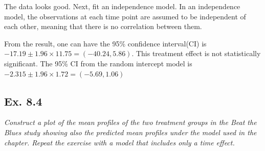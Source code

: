 \documentclass[
]{article}
\newenvironment{Shaded}{\begin{snugshade}}{\end{snugshade}}
\newcommand{\AttributeTok}[1]{\textcolor[rgb]{0.77,0.63,0.00}{#1}}
\newcommand{\ErrorTok}[1]{\textcolor[rgb]{0.64,0.00,0.00}{\textbf{#1}}}
\newcommand{\FloatTok}[1]{\textcolor[rgb]{0.00,0.00,0.81}{#1}}
\newcommand{\FunctionTok}[1]{\textcolor[rgb]{0.00,0.00,0.00}{#1}}
\newcommand{\NormalTok}[1]{#1}
\newcommand{\OtherTok}[1]{\textcolor[rgb]{0.56,0.35,0.01}{#1}}
\newcommand{\SpecialCharTok}[1]{\textcolor[rgb]{0.00,0.00,0.00}{#1}}
\newcommand{\StringTok}[1]{\textcolor[rgb]{0.31,0.60,0.02}{#1}}
\begin{document}
The data looks good. Next, fit an independence model. In an independence
model, the observations at each time point are assumed to be independent
of each other, meaning that there is no correlation between them.

\begin{Shaded}
\end{Shaded}

From the result, one can have the 95\% confidence interval(CI) is
\(-17.19 \pm 1.96\times11.75= (-40.24, 5.86)\). This treatment effect is
not statistically significant. The 95\% CI from the random intercept
model is \(-2.315 \pm 1.96\times1.72= (-5.69, 1.06)\)

\hypertarget{ex.-8.4}{%
\subsection{Ex. 8.4}\label{ex.-8.4}}

\emph{Construct a plot of the mean profiles of the two treatment groups
in the Beat the Blues study showing also the predicted mean profiles
under the model used in the chapter. Repeat the exercise with a model
that includes only a time effect.}
\end{document}
